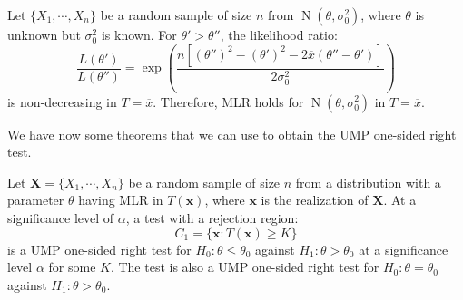 \documentclass{huhtakm-template-book-v2}
\DeclareMathOperator{\N}{N}
\begin{document}
\begin{eg}
	\label{Chapter 4 (Example) MLR for N(mu,sigma^2)}
	Let $\{X_{1},\cdots,X_{n}\}$ be a random sample of size $n$ from $\N(\theta,\sigma_{0}^{2})$, where $\theta$ is unknown but $\sigma_{0}^{2}$ is known. For $\theta'>\theta''$, the likelihood ratio:
	\begin{equation*}
		\frac{L(\theta')}{L(\theta'')}=\exp\left(\frac{n[(\theta'')^{2}-(\theta')^{2}-2\overline{x}(\theta''-\theta')]}{2\sigma_{0}^{2}}\right)
	\end{equation*}
	is non-decreasing in $T=\overline{x}$. Therefore, MLR holds for $\N(\theta,\sigma_{0}^{2})$ in $T=\overline{x}$.
\end{eg}
We have now some theorems that we can use to obtain the UMP one-sided right test.
\begin{thm}
	Let $\mathbf{X}=\{X_{1},\cdots,X_{n}\}$ be a random sample of size $n$ from a distribution with a parameter $\theta$ having MLR in $T(\mathbf{x})$, where $\mathbf{x}$ is the realization of $\mathbf{X}$. At a significance level of $\alpha$, a test with a rejection region:
	\begin{equation*}
		C_{1}=\{\mathbf{x}:T(\mathbf{x})\geq K\}
	\end{equation*}
	is a UMP one-sided right test for $H_{0}:\theta\leq\theta_{0}$ against $H_{1}:\theta>\theta_{0}$ at a significance level $\alpha$ for some $K$. The test is also a UMP one-sided right test for $H_{0}:\theta=\theta_{0}$ against $H_{1}:\theta>\theta_{0}$.
\end{thm}
\end{document}
